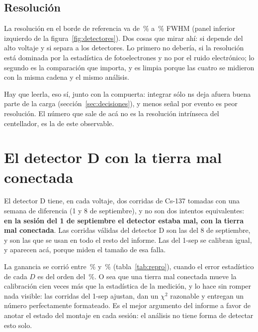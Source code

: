 \documentclass[11pt,a4paper]{article}
\begin{document}
\subsection{Resolución}

La resolución en el borde de referencia va de \FwhmMin\,\% a \FwhmMax\,\%
FWHM (panel inferior izquierdo de la figura~\ref{fig:detectores}). Dos cosas
que mirar ahí: si depende del alto voltaje y si separa a los detectores. Lo
primero no debería, si la resolución está dominada por la estadística de
fotoelectrones y no por el ruido electrónico; lo segundo es la comparación que
importa, y es limpia porque las cuatro se midieron con la misma cadena y el
mismo análisis.

Hay que leerla, eso sí, junto con la compuerta: integrar sólo \PostFijo{} ns
deja afuera buena parte de la carga (sección~\ref{sec:decisiones}), y menos
señal por evento es peor resolución. El número que sale de acá no es la
resolución intrínseca del centellador, es la de este observable.

\section{El detector D con la tierra mal conectada}
\label{sec:repro}

El detector D tiene, en cada voltaje, dos corridas de Cs-137 tomadas con una
semana de diferencia (1 y 8 de septiembre), y no son dos intentos equivalentes:
\textbf{en la sesión del 1 de septiembre el detector estaba mal, con la tierra
mal conectada}. Las corridas válidas del detector D son las del 8 de
septiembre, y son las que se usan en todo el resto del informe. Las del 1-sep
se calibran igual, y aparecen acá, porque miden el tamaño de esa falla.

\begin{table}[htbp]
\centering
\caption{El mismo punto y la misma fuente, con y sin la falla de tierra.}
\label{tab:repro}
{\small}
\end{table}

La ganancia se corrió entre \RepMin\,\% y \RepMax\,\% (tabla~\ref{tab:repro}),
cuando el error estadístico de cada $D$ es del orden del \ErrRelMediano\,\%. O
sea que una tierra mal conectada mueve la calibración cien veces más que la
estadística de la medición, y lo hace sin romper nada visible: las corridas del
1-sep ajustan, dan un $\chi^2$ razonable y entregan un número perfectamente
formateado. Es el mejor argumento del informe a favor de anotar el estado del
montaje en cada sesión: el análisis no tiene forma de detectar esto solo.
\end{document}
